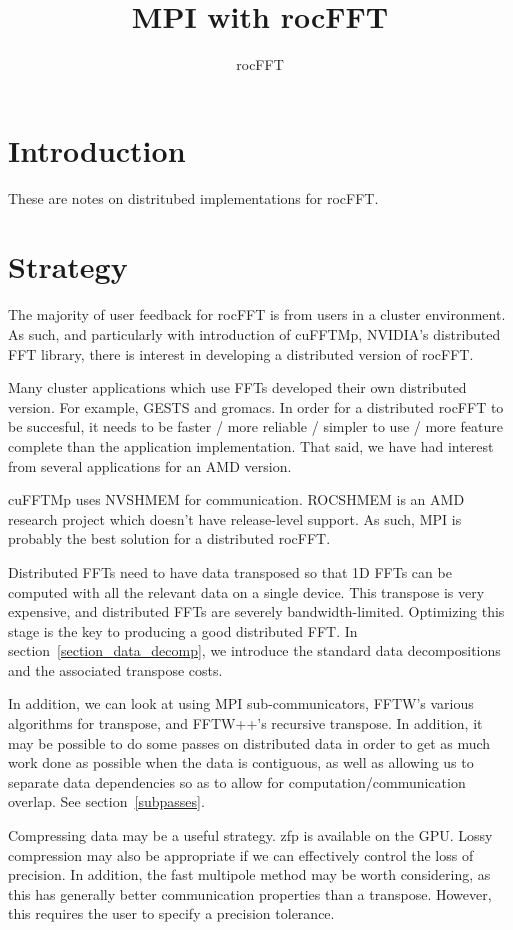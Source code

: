 \documentclass[12pt]{article}
\title{MPI with rocFFT}
\author{rocFFT}
\renewcommand{\(}{\left(}
\renewcommand{\)}{\right)}
\begin{document}
\maketitle

\section{Introduction}

These are notes on distritubed implementations for rocFFT.

\section{Strategy}

The majority of user feedback for rocFFT is from users in a cluster
environment.  As such, and particularly with introduction of cuFFTMp,
NVIDIA's distributed FFT library, there is interest in developing a
distributed version of rocFFT.

Many cluster applications which use FFTs developed their own
distributed version.  For example, GESTS and gromacs.  In order for a
distributed rocFFT to be succesful, it needs to be faster / more
reliable / simpler to use / more feature complete than the application
implementation.  That said, we have had interest from several
applications for an AMD version.

cuFFTMp uses NVSHMEM for communication.  ROCSHMEM is an AMD research
project which doesn't have release-level support.  As such, MPI is
probably the best solution for a distributed rocFFT.

Distributed FFTs need to have data transposed so that 1D FFTs can be
computed with all the relevant data on a single device.  This
transpose is very expensive, and distributed FFTs are severely
bandwidth-limited.  Optimizing this stage is the key to producing a
good distributed FFT.  In section~\ref{section_data_decomp}, we
introduce the standard data decompositions and the associated
transpose costs.

In addition, we can look at using MPI sub-communicators, FFTW's
various algorithms for transpose, and FFTW++'s recursive transpose.
In addition, it may be possible to do some passes on distributed data
in order to get as much work done as possible when the data is
contiguous, as well as allowing us to separate data dependencies so as
to allow for computation/communication overlap.  See
section~\ref{subpasses}.

Compressing data may be a useful strategy.  zfp is available on the
GPU.  Lossy compression may also be appropriate if we can effectively
control the loss of precision.  In addition, the fast multipole method
may be worth considering, as this has generally better communication
properties than a transpose.  However, this requires the user to
specify a precision tolerance.
\end{document}
